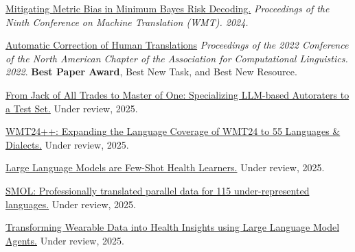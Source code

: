 
\href{https://aclanthology.org/2024.wmt-1.109.pdf}{Mitigating Metric Bias in Minimum Bayes Risk Decoding.} \emph{Proceedings of the Ninth Conference on Machine Translation (WMT). 2024.}

\href{https://aclanthology.org/2022.naacl-main.36.pdf}{Automatic Correction of Human Translations} \emph{Proceedings of the 2022 Conference of the North American Chapter of the Association for Computational Linguistics. 2022}. \textbf{Best Paper Award}, Best New Task, and Best New Resource. %

\href{https://arxiv.org/pdf/2411.15387}{From Jack of All Trades to Master of One: Specializing LLM-based Autoraters to a Test Set.} Under review, 2025.

\href{https://arxiv.org/pdf/2502.12404}{WMT24++: Expanding the Language Coverage of WMT24 to 55 Languages \& Dialects.} Under review, 2025.

\href{https://arxiv.org/pdf/2305.15525}{Large Language Models are Few-Shot Health Learners.} Under review, 2025.

\href{https://arxiv.org/pdf/2502.12301}{SMOL: Professionally translated parallel data for 115 under-represented languages.} Under review, 2025.

\href{https://arxiv.org/pdf/2406.06464}{Transforming Wearable Data into Health Insights using Large Language Model Agents.} Under review, 2025.

